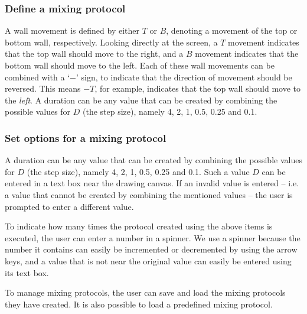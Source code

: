 \subsubsection{Define a mixing protocol}
A wall movement is defined by either $T$ or $B$, denoting a movement of the top or bottom wall, respectively. Looking directly at the screen, a $T$ movement indicates that the top wall should move to the right, and a $B$ movement indicates that the bottom wall should move to the left. Each of these wall movements can be combined with a `$-$' sign, to indicate that the direction of movement should be reversed. This means $-T$, for example, indicates that the top wall should move to the \emph{left}. A duration can be any value that can be created by combining the possible values for $D$ (the step size), namely 4, 2, 1, 0.5, 0.25 and 0.1.

\subsubsection{Set options for a mixing protocol}
A duration can be any value that can be created by combining the possible values for $D$ (the step size), namely 4, 2, 1, 0.5, 0.25 and 0.1. Such a value $D$ can be entered in a text box near the drawing canvas. If an invalid value is entered -- i.e. a value that cannot be created by combining the mentioned values -- the user is prompted to enter a different value.

To indicate how many times the protocol created using the above items is executed, the user can enter a number in a spinner. We use a spinner because the number it contains can easily be incremented or decremented by using the arrow keys, and a value that is not near the original value can easily be entered using its text box.

To manage mixing protocols, the user can save and load the mixing protocols they have created. It is also possible to load a predefined mixing protocol.





